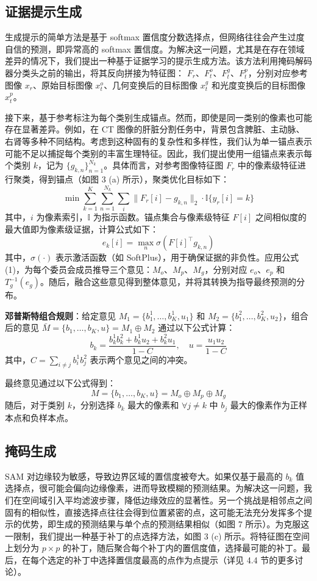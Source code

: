 \documentclass[12pt,a4paper]{article}
\begin{document}
	\subsection{证据提示生成}
	生成提示的简单方法是基于 softmax 置信度分数选择点，但网络往往会产生过度自信的预测，即异常高的 softmax 置信度。为解决这一问题，尤其是在存在领域差异的情况下，我们提出一种基于证据学习的提示生成方法。该方法利用掩码解码器分类头之前的输出，将其反向拼接为特征图：
	$F_r$、$F_t^o$、$F_t^g$、$F_t^p$，分别对应参考图像 $x_r$、原始目标图像 $x_t^o$、几何变换后的目标图像 $x_t^g$ 和光度变换后的目标图像 $x_t^p$。
	
	接下来，基于参考标注为每个类别生成锚点。然而，即使是同一类别的像素也可能存在显著差异。例如，在 CT 图像的肝脏分割任务中，背景包含脾脏、主动脉、右肾等多种不同结构。考虑到这种固有的复杂性和多样性，我们认为单一锚点表示可能不足以捕捉每个类别的丰富生理特征。因此，我们提出使用一组锚点来表示每个类别 $k$，记为 $\{g_{k,n}\}_{n=1}^{N_k}$。具体而言，对参考图像特征图 $F_r$ 中的像素级特征进行聚类，得到锚点（如图 3 (a) 所示），聚类优化目标如下：
	\[
	\min \sum_{k=1}^K \sum_{n=1}^{N_k} \sum_i \|F_r[i] - g_{k,n}\|_2 \cdot \mathbb{I}\{y_r[i] = k\} \tag{2}
	\]
	其中，$i$ 为像素索引，$\mathbb{I}$ 为指示函数。锚点集合与像素级特征 $F[i]$ 之间相似度的最大值即为像素级证据，计算公式如下：
	\[
	e_k[i] = \max_n \sigma(F[i]^\top g_{k,n}) \tag{3}
	\]
	其中，$\sigma(\cdot)$ 表示激活函数（如 SoftPlus），用于确保证据的非负性。应用公式 (1)，为每个委员会成员推导三个意见：$M_o$、$M_p$、$M_g$，分别对应 $e_o$、$e_p$ 和 $T_{g}^{-1}(e_g)$。随后，融合这些意见得到整体意见，并将其转换为指导最终预测的分布。
	
	\textbf{邓普斯特组合规则}：给定意见 $M_1 = \{b_1^1, \dots, b_K^1, u_1\}$ 和 $M_2 = \{b_1^2, \dots, b_K^2, u_2\}$，组合后的意见 $\bar{M} = \{b_1, \dots, b_K, u\} = M_1 \oplus M_2$ 通过以下公式计算：
	\[
	b_k = \frac{b_k^1 b_k^2 + b_k^1 u_2 + b_k^2 u_1}{1 - C}, \quad u = \frac{u_1 u_2}{1 - C} \tag{4}
	\]
	其中，$C = \sum_{i \neq j} b_i^1 b_j^2$ 表示两个意见之间的冲突。
	
	最终意见通过以下公式得到：
	\[
	M = \{b_1, \dots, b_K, u\} = M_o \oplus M_p \oplus M_g \tag{5}
	\]
	随后，对于类别 $k$，分别选择 $b_k$ 最大的像素和 $\forall j \neq k$ 中 $b_j$ 最大的像素作为正样本点和负样本点。
	
	\subsection{掩码生成}
	SAM 对边缘较为敏感，导致边界区域的置信度被夸大。如果仅基于最高的 $b_k$ 值选择点，很可能会偏向边缘像素，进而导致模糊的预测结果。为解决这一问题，我们在空间域引入平均滤波步骤，降低边缘效应的显著性。另一个挑战是相邻点之间固有的相似性，直接选择点往往会得到位置紧密的点，这可能无法充分发挥多个提示的优势，即生成的预测结果与单个点的预测结果相似（如图 7 所示）。为克服这一限制，我们提出一种基于补丁的点选择方法，如图 3 (c) 所示。将特征图在空间上划分为 $p \times p$ 的补丁，随后聚合每个补丁内的置信度值，选择最可能的补丁。最后，在每个选定的补丁中选择置信度最高的点作为点提示（详见 4.4 节的更多讨论）。
	
\end{document}
